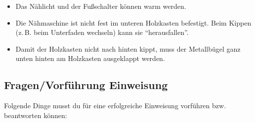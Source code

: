 \documentclass{\basedir/fablab-document}
\begin{document}
\begin{itemize}
	\item Das Nählicht und der Fußschalter können warm werden.
	\item Die Nähmaschine ist nicht fest im unteren Holzkasten befestigt. Beim Kippen (z.\,B. beim Unterfaden wechseln) kann sie \enquote{herausfallen}.
	\item Damit der Holzkasten nicht nach hinten kippt, muss der Metallbügel ganz unten hinten am Holzkasten ausgeklappt werden.
\end{itemize}

\pagebreak

\subsection{Fragen/Vorführung Einweisung}
Folgende Dinge musst du für eine erfolgreiche Einweisung vorführen bzw. beantworten können:
\end{document}
